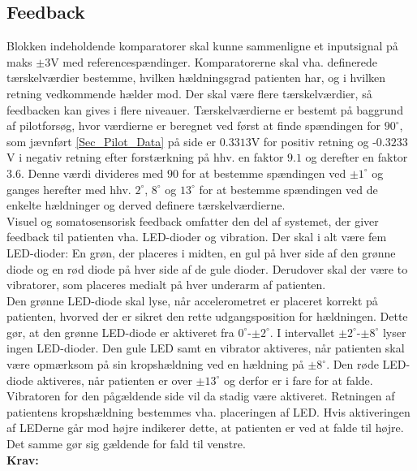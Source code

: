 \subsection{Feedback}\label{KomparatorAfs}
Blokken indeholdende komparatorer skal kunne sammenligne et inputsignal på maks $\pm3$V med referencespændinger. Komparatorerne skal vha. definerede tærskelværdier bestemme, hvilken hældningsgrad patienten har, og i hvilken retning vedkommende hælder mod. Der skal være flere tærskelværdier, så feedbacken kan gives i flere niveauer. Tærskelværdierne er bestemt på baggrund af pilotforsøg, hvor værdierne er beregnet ved først at finde spændingen for $90^{\circ}$, som jævnført \ref{Sec_Pilot_Data} på side \pageref{Sec_Pilot_Data} er $0.3313$V for positiv retning og -$0.3233$V i negativ retning efter forstærkning på hhv. en faktor $9.1$ og derefter en faktor $3.6$. Denne værdi divideres med $90$ for at bestemme spændingen ved $\pm1^{\circ}$ og ganges herefter med hhv. $2^{\circ}$,  $8^{\circ}$ og $13^{\circ}$ for at bestemme spændingen ved de enkelte hældninger og derved definere tærskelværdierne.\\
Visuel og somatosensorisk feedback omfatter den del af systemet, der giver feedback til patienten vha. LED-dioder og vibration. Der skal i alt være fem LED-dioder: En grøn, der placeres i midten, en gul på hver side af den grønne diode og en rød diode på hver side af de gule dioder. Derudover skal der være to vibratorer, som placeres medialt på hver underarm af patienten.\\
Den grønne LED-diode skal lyse, når accelerometret er placeret korrekt på patienten, hvorved der er sikret den rette udgangsposition for hældningen. Dette gør, at den grønne LED-diode er aktiveret fra $0^{\circ}$-$\pm2^{\circ}$. I intervallet $\pm2^{\circ}$-$\pm8^{\circ}$ lyser ingen LED-dioder. Den gule LED samt en vibrator aktiveres, når patienten skal være opmærksom på sin kropshældning ved en hældning på $\pm8^{\circ}$. Den røde LED-diode aktiveres, når patienten er over $\pm13^{\circ}$ og derfor er i fare for at falde. Vibratoren for den pågældende side vil da stadig være aktiveret. Retningen af patientens kropshældning bestemmes vha. placeringen af LED. Hvis aktiveringen af LEDerne går mod højre indikerer dette, at patienten er ved at falde til højre. Det samme gør sig gældende for fald til venstre. \\
\textbf{Krav:} 
